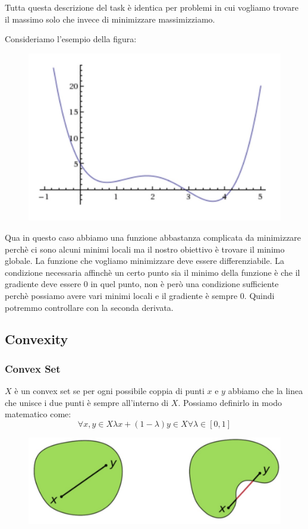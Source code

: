 \documentclass[14pt]{extreport}
\begin{document}
Tutta questa descrizione del task è identica per problemi in cui vogliamo trovare il massimo solo che invece di minimizzare massimizziamo.

Consideriamo l'esempio della figura:

\begin{figure}[H]
\centering
\includegraphics[width=0.5\linewidth]{216.jpeg}
\end{figure}

Qua in questo caso abbiamo una funzione abbastanza complicata da minimizzare perchè ci sono alcuni minimi locali ma il nostro obiettivo è trovare il
minimo globale. La funzione che vogliamo minimizzare deve essere differenziabile. La condizione necessaria affinchè un certo punto sia il minimo della
funzione è che il gradiente deve essere 0 in quel punto, non è però una condizione sufficiente perchè possiamo avere vari minimi locali e il gradiente
è sempre 0. Quindi potremmo controllare con la seconda derivata.


\subsection{Convexity}

\subsubsection{Convex Set}

$X$ è un convex set se per ogni possibile coppia di punti $x$ e $y$ abbiamo che la linea che unisce i due punti è sempre all'interno di $X$. Possiamo
definirlo in modo matematico come:
$$\forall x,y \in X  \lambda x + ( 1-\lambda )y \in X   \forall \lambda \in [0,1]$$

\begin{figure}[H]
\centering
\includegraphics[width=0.5\linewidth]{217.jpeg}
\end{figure}
\end{document}
